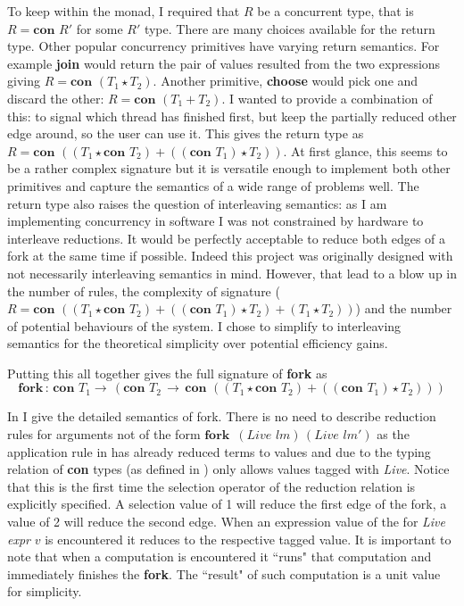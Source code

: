 \documentclass[12pt,twoside,notitlepage]{report}
\begin{document}
To keep within the monad, I required that $ R $ be a concurrent type, that is $ R =  \textbf{con } R' $ for some $ R' $ type. There are many choices available for the return type. Other popular concurrency primitives have varying return semantics. For example \textbf{join} would return the pair of values resulted from the two expressions giving $ R = \textbf{con }(T_1 \star T_2) $. Another primitive, \textbf{choose} would pick one and discard the other: $ R = \textbf{con }(T_1 + T_2) $. I wanted to provide a combination of this: to signal which thread has finished first, but keep the partially reduced other edge around, so the user can use it. This gives the return type as $ R = \textbf{con }((T_1\star \textbf{con } T_2) + ((\textbf{con } T_1) \star T_2)) $. At first glance, this seems to be a rather complex signature but  it is versatile enough to implement both other primitives and capture the semantics of a wide range of problems well. The return type also raises the question of interleaving semantics: as I am implementing concurrency in software I was not constrained by hardware to interleave reductions. It would be perfectly acceptable to reduce both edges of a fork at the same time if possible. Indeed this project was originally designed with not necessarily interleaving semantics in mind. However, that lead to a blow up in the number of rules, the complexity of signature ($ R = \textbf{con }((T_1\star \textbf{con } T_2) + ((\textbf{con } T_1) \star T_2) + (T_1 \star T_2))   $) and the number of potential behaviours of the system. I chose to simplify to interleaving semantics for the theoretical simplicity over potential efficiency gains.

Putting this all together gives the full signature of \textbf{fork} as 
\[ \textbf{fork} \, : \, \textbf{con } T_1 \rightarrow \, (\textbf{con } T_2\, \rightarrow\, \textbf{con }((T_1\star \textbf{con } T_2) + ((\textbf{con } T_1) \star T_2)) ) \] 



In  I give the detailed semantics of fork. There is no need to describe reduction rules for arguments not of the form $ \textbf{fork }\, (\textit{Live } lm)\,(\textit{Live } lm') $ as the application rule in  has already reduced terms to values and due to the typing relation of \textbf{con } types (as defined in ) only allows values tagged with \textit{Live}. Notice that this is the first time the selection operator of the reduction relation is explicitly specified. A selection value of 1 will reduce the first edge of the fork, a value of 2 will reduce the second edge. When an expression value of the for \textit{Live expr }$ v $ is encountered it reduces to the respective tagged value. It is important to note that when a computation is encountered it ``runs" that computation and immediately finishes the \textbf{fork}. The ``result" of such computation is a unit value for simplicity. 
\end{document}

